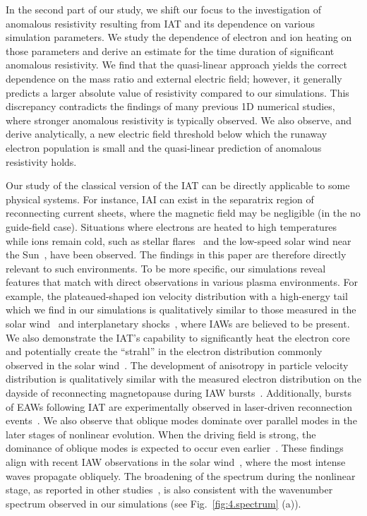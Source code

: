 \documentclass[%
 reprint,
 amsmath,
 amssymb,
 aps,
 prx,
floatfix,
superscriptaddress
]{revtex4-2}
\begin{document}
In the second part of our study, we shift our focus to the investigation of anomalous resistivity resulting from IAT and its dependence on various simulation parameters. 
We study the dependence of electron and ion heating on those parameters and derive an estimate for the time duration of significant anomalous resistivity.
We find that the quasi-linear approach yields the correct dependence on the mass ratio and external electric field; however, it generally predicts a larger absolute value of resistivity compared to our simulations. 
This discrepancy contradicts the findings of many previous 1D numerical studies, where stronger anomalous resistivity is typically observed.
We also observe, and derive analytically, a new electric field threshold below which the runaway electron population is small and the quasi-linear prediction of anomalous resistivity holds. 

Our study of the classical version of the IAT can be directly applicable to some physical systems. 
For instance, IAI can exist in the separatrix region of reconnecting current sheets, where the magnetic field may be negligible (in the no guide-field case). 
Situations where electrons are heated to high temperatures while ions remain cold, such as stellar flares~\cite{polito2018broad} and the low-speed solar wind near the Sun~\cite{verscharen2022electron,mozer2022core}, have been observed.
The findings in this paper are therefore directly relevant to such environments.
To be more specific, our simulations reveal features that match with direct observations in various plasma environments. 
For example, the plateaued-shaped ion velocity distribution with a high-energy tail which we find in our simulations is qualitatively similar to those measured in the solar wind~\cite{Mozer2020a} and interplanetary shocks~\cite{wilson2020electron}, where IAWs are believed to be present. 
We also demonstrate the IAT's capability to significantly heat the electron core and potentially create the ``strahl'' in the electron distribution commonly observed in the solar wind~\cite{verscharen2019multi}.
The development of anisotropy in particle velocity distribution is qualitatively similar with the measured electron distribution on the dayside of reconnecting magnetopause during IAW bursts~\cite{uchino2017waves,steinvall2021large}. 
Additionally, bursts of EAWs following IAT are experimentally observed in laser-driven reconnection events~\cite{zhang2022}.
We also observe that oblique modes dominate over parallel modes in the later stages of nonlinear evolution. 
When the driving field is strong, the dominance of oblique modes is expected to occur even earlier~\cite{bychenkov1988ion}.
These findings align with recent IAW observations in the solar wind~\cite{mozer2021triggered}, where the most intense waves propagate obliquely. 
The broadening of the spectrum during the nonlinear stage, as reported in other studies~\cite{Mozer2020b}, is also consistent with the wavenumber spectrum observed in our simulations (see Fig.~\ref{fig:4.spectrum} (a)).
\end{document}
